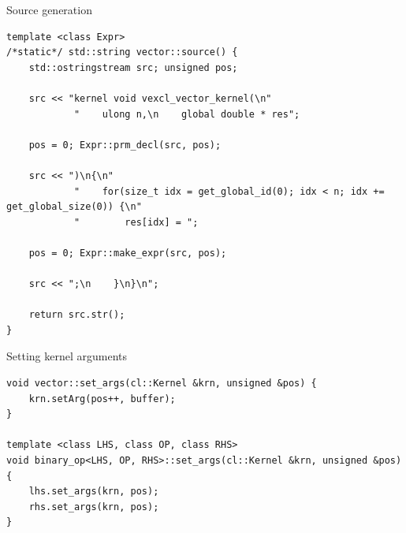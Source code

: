 \documentclass[@BEAMER_OPTIONS@]{beamer}
\begin{document}
\note{ }

\begin{frame}[fragile]{Source generation}
    \begin{exampleblock}{}
        \begin{lstlisting}
template <class Expr>
/*static*/ std::string vector::source() {
    std::ostringstream src; unsigned pos;

    src << "kernel void vexcl_vector_kernel(\n"
            "    ulong n,\n    global double * res";

    pos = 0; Expr::prm_decl(src, pos);

    src << ")\n{\n"
            "    for(size_t idx = get_global_id(0); idx < n; idx += get_global_size(0)) {\n"
            "        res[idx] = ";

    pos = 0; Expr::make_expr(src, pos);

    src << ";\n    }\n}\n";

    return src.str();
}
        \end{lstlisting}
    \end{exampleblock}
\end{frame}

\note{ }

\begin{frame}[fragile]{Setting kernel arguments}
    \begin{exampleblock}{}
        \begin{lstlisting}
void vector::set_args(cl::Kernel &krn, unsigned &pos) {
    krn.setArg(pos++, buffer);
}

template <class LHS, class OP, class RHS>
void binary_op<LHS, OP, RHS>::set_args(cl::Kernel &krn, unsigned &pos) {
    lhs.set_args(krn, pos);
    rhs.set_args(krn, pos);
}
        \end{lstlisting}
    \end{exampleblock}
\end{frame}

\note{ }
\end{document}
